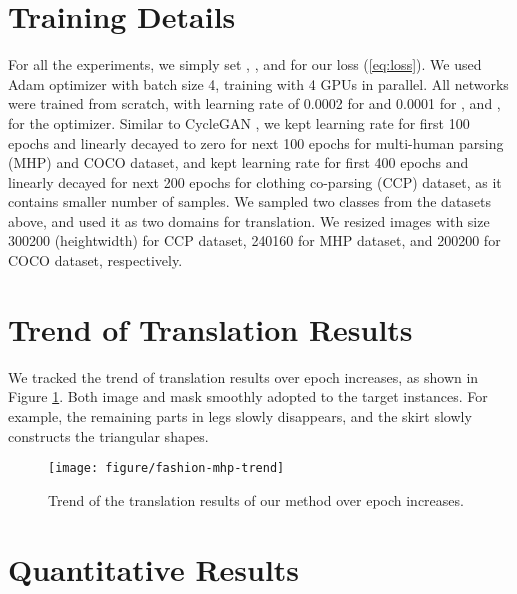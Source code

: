 \documentclass{article} \usepackage{iclr2019_conference,times}
\begin{document}
\section{Training Details}
\label{sec:training-details}

For all the experiments, we simply set , , and  for our loss (\ref{eq:loss}).
We used Adam \citep{kingma2014adam} optimizer with batch size 4, training with 4 GPUs in parallel.
All networks were trained from scratch, with learning rate of 0.0002 for  and 0.0001 for , and ,  for the optimizer.
Similar to CycleGAN \citep{zhu2017unpaired}, we kept learning rate for first 100 epochs and linearly decayed to zero for next 100 epochs
for multi-human parsing (MHP) \citep{zhao2018understanding} and COCO \citep{lin2014microsoft} dataset,
and kept learning rate for first 400 epochs and linearly decayed for next 200 epochs
for clothing co-parsing (CCP) \citep{yang2014clothing} dataset, as it contains smaller number of samples.
We sampled two classes from the datasets above, and used it as two domains for translation.
We resized images with size 300200 (heightwidth) for CCP dataset, 240160 for MHP dataset, and 200200 for COCO dataset, respectively.










\section{Trend of Translation Results}
\label{sec:epoch-trends}

We tracked the trend of translation results over epoch increases, as shown in Figure \ref{fig:fashion-mhp-trend}.
Both image and mask smoothly adopted to the target instances.
For example, the remaining parts in legs slowly disappears,
and the skirt slowly constructs the triangular shapes.

\begin{figure}[H]
	\centering
	\texttt{[image: figure/fashion-mhp-trend]}
	\caption{
	Trend of the translation results of our method over epoch increases.
} \label{fig:fashion-mhp-trend}
\end{figure}


\newpage
\section{Quantitative Results}
\label{sec:cls-score}
\end{document}
